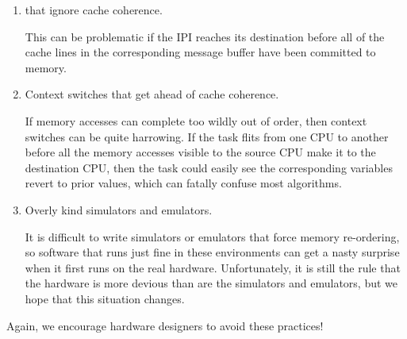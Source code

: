 \begin{enumerate}
\item	{} that ignore cache coherence.

	This can be problematic if the IPI reaches its destination
	before all of the cache lines in the corresponding message
	buffer have been committed to memory.

\item	Context switches that get ahead of cache coherence.

	If memory accesses can complete too wildly out of order,
	then context switches can be quite harrowing.
	If the task flits from one CPU to another before all the
	memory accesses visible to the source CPU make it to the
	destination CPU, then the task could easily see the corresponding
	variables revert to prior values, which can fatally confuse
	most algorithms.

\item	Overly kind simulators and emulators.

	It is difficult to write simulators or emulators that force
	memory re-ordering, so software that runs just fine in
	these environments can get a nasty surprise when it first
	runs on the real hardware.
	Unfortunately, it is still the rule that the hardware is more
	devious than are the simulators and emulators, but we hope that
	this situation changes.
\end{enumerate}

Again, we encourage hardware designers to avoid these practices!

